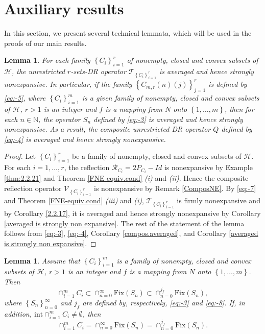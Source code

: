 \documentclass[]{interact}
\theoremstyle{plain}%
\newtheorem{lemma}[theorem]{Lemma}
\theoremstyle{definition}
\theoremstyle{remark}
\begin{document}
\section{\label{sec4}Auxiliary results}
In this section, we present several technical lemmata, which will
be used in the proofs of our main results.
\begin{lemma}
\label{lem1}For each family $\left\{ C_{i}\right\} _{i=1}^{r}$ of
nonempty, closed and convex subsets of $\mathcal{H}$, the \color{black}unrestricted \color{black}
$r$-sets-DR operator $\mathcal{T}_{\left\{ C_{i}\right\} _{i=1}^{r}}$
is averaged and hence strongly nonexpansive. In particular, if the
family $\left\{ C_{m,r}\left(n\right)\left(j\right)\right\} _{j=1}^{r}$
is defined by \eqref{eq:-5}, where $\left\{ C_{i}\right\} _{i=1}^{m}$
is a given family of nonempty, closed and convex subsets of $\mathcal{H}$,
$r>1$ is an integer and $f$ is a mapping from $N$ onto $\left\{ 1,\dots,m\right\} $,
then for each $n\in\mathbb{N}$, the operator $S_{n}$ defined by
\eqref{eq:-3} is averaged and hence strongly nonexpansive. As a result,
the composite \color{black}unrestricted \color{black} DR operator $Q$ defined by \eqref{eq:-4} is
averaged and hence strongly nonexpansive.
\end{lemma}
\begin{proof}
Let $\left\{ C_{i}\right\} _{i=1}^{r}$ be a family of nonempty, closed
and convex subsets of $\mathcal{H}$. For each $i=1,\dots,r$, the
reflection $\mathcal{R}_{C_{i}}=2P_{C_{i}}-Id$ is nonexpansive by
Example \ref{thm:2.2.21} and Theorem \ref{FNE-equiv.cond}\textit{
(i)} and \textit{(ii)}. Hence the composite reflection operator $\mathcal{V}_{\left\{ C_{i}\right\} _{i=1}^{r}}$
is nonexpansive by Remark \ref{ComposNE}. By \eqref{eq:-7} and Theorem
\ref{FNE-equiv.cond} \textit{(iii)} and \textit{(i)}, $\mathcal{T}_{\left\{ C_{i}\right\} _{i=1}^{r}}$
is firmly nonexpansive and by Corollary \ref{2.2.17}, it is averaged
and hence strongly nonexpansive by Corollary \ref{averaged is strongly non expansive}.
The rest of the statement of the lemma follows from \eqref{eq:-3},
\eqref{eq:-4}, Corollary \ref{compos.averaged}, and Corollary \ref{averaged is strongly non expansive}.
\end{proof}
\begin{lemma}
\label{lem2}Assume that $\left\{ C_{i}\right\} _{i=1}^{m}$ is a
family of nonempty, closed and convex subsets of $\mathcal{H}$, $r>1$
is an integer and $f$ is a mapping from $N$ onto $\left\{ 1,\dots,m\right\} $.
Then
\[
\cap_{i=1}^{m}C_{i}\subset\cap_{n=0}^{\infty}\mathrm{Fix}(S_{n})\subset\cap_{n=0}^{j_{f}}\mathrm{Fix}(S_{n}),
\]
where $\left\{ S_{n}\right\} _{n=0}^{\infty}$ and $j_{f}$ are
defined by, respectively, \eqref{eq:-3} and \eqref{eq:-8}. If, in
addition, $\mathrm{int}\cap_{i=1}^{m}C_{i}\not=\emptyset$, then
\[
\cap_{i=1}^{m}C_{i}=\cap_{n=0}^{\infty}\mathrm{Fix}(S_{n})=\cap_{n=0}^{j_{f}}\mathrm{Fix}(S_{n}).
\]
\end{lemma}
\end{document}
